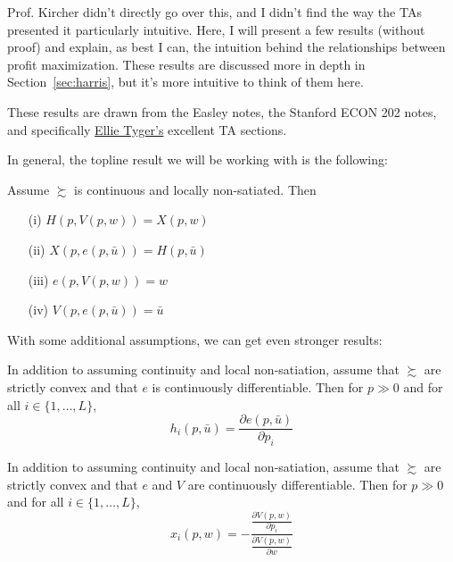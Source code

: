 \documentclass[12pt]{article}
\begin{document}
\begin{remark}
	Prof. Kircher didn't directly go over this, and I didn't find the way the TAs presented it particularly intuitive. Here, I will present a few results (without proof) and explain, as best I can, the intuition behind the relationships between profit maximization. These results are discussed more in depth in Section~\ref{sec:harris}, but it's more intuitive to think of them here.
	
	These results are drawn from the Easley notes, the Stanford ECON 202 notes, and specifically \href{https://www.ellietyger.com/}{Ellie Tyger's} excellent TA sections.
\end{remark}

In general, the topline result we will be working with is the following:

\begin{proposition}
	Assume $\succsim$ is continuous and locally non-satiated. Then
	\begin{itemize}
		\item[(i)] $H(p,V(p,w)) = X(p,w)$
		
		\item[(ii)] $X(p,e(p,\bar{u})) = H(p,\bar{u})$
		
		\item[(iii)] $e(p,V(p,w)) = w$
		
		\item[(iv)] $V(p,e(p,\bar{u})) = \bar{u}$
	\end{itemize}
\end{proposition}

With some additional assumptions, we can get even stronger results:

\begin{proposition}
	 In addition to assuming continuity and local non-satiation, assume that $\succsim$ are strictly convex and that $e$ is continuously differentiable. Then for $p \gg 0$ and for all $i \in \{1,\dots,L\}$,
	\[
	h_i(p,\bar{u}) = \frac{\partial e(p,\bar{u})}{\partial p_i}
	\]
\end{proposition}

\begin{proposition}
	 In addition to assuming continuity and local non-satiation, assume that $\succsim$ are strictly convex and that $e$ and $V$ are continuously differentiable. Then for $p \gg 0$ and for all $i \in \{1,\dots,L\}$,
	\[
	x_i(p,w) = -\frac{\frac{\partial V(p,w)}{\partial p_i}}{\frac{\partial V(p,w)}{\partial w}}
	\]
\end{proposition}
\end{document}
